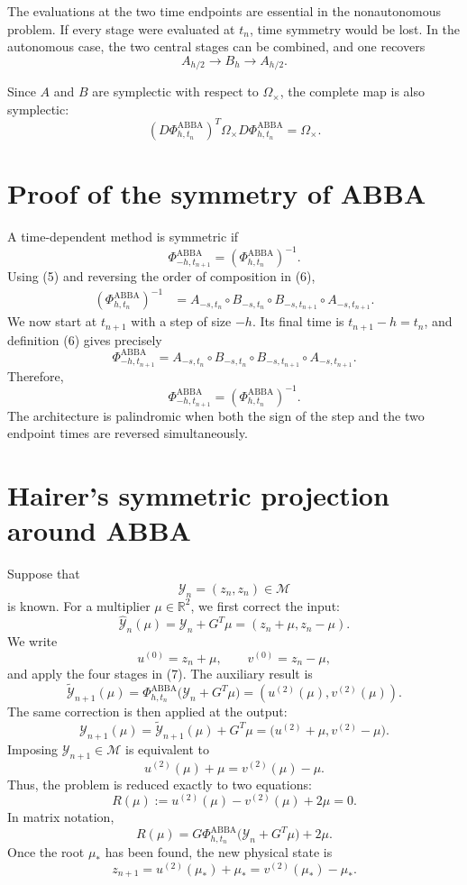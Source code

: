 \documentclass[11pt,a4paper]{article}
\newcommand{\R}{\mathbb{R}}
\newcommand{\Y}{\mathcal{Y}}
\newcommand{\M}{\mathcal{M}}
\newcommand{\Om}{\Omega_{\times}}
\newcommand{\PhiAB}{\Phi^{\mathrm{ABBA}}_{h,t_n}}
\begin{document}
The evaluations at the two time endpoints are essential in the nonautonomous problem.
If every stage were evaluated at $t_n$, time symmetry would be lost. In the autonomous
case, the two central stages can be combined, and one recovers
\[
 A_{h/2}\longrightarrow B_h\longrightarrow A_{h/2}.
\]

Since $A$ and $B$ are symplectic with respect to $\Om$, the complete map is also symplectic:
\[
 \boxed{
 (D\PhiAB)^T\Om D\PhiAB=\Om.
 } \tag{8}
\]

\section{Proof of the symmetry of ABBA}

A time-dependent method is symmetric if
\[
 \Phi^{\mathrm{ABBA}}_{-h,t_{n+1}}
 =\left(\Phi^{\mathrm{ABBA}}_{h,t_n}\right)^{-1}. \tag{9}
\]
Using (5) and reversing the order of composition in (6),
\begin{align*}
 \left(\Phi^{\mathrm{ABBA}}_{h,t_n}\right)^{-1}
 &={}
 A_{-s,t_n}
 \circ B_{-s,t_n}
 \circ B_{-s,t_{n+1}}
 \circ A_{-s,t_{n+1}}.
\end{align*}
We now start at $t_{n+1}$ with a step of size $-h$. Its final time is
$t_{n+1}-h=t_n$, and definition (6) gives precisely
\[
 \Phi^{\mathrm{ABBA}}_{-h,t_{n+1}}
 =A_{-s,t_n}
  \circ B_{-s,t_n}
  \circ B_{-s,t_{n+1}}
  \circ A_{-s,t_{n+1}}.
\]
Therefore,
\[
 \boxed{
 \Phi^{\mathrm{ABBA}}_{-h,t_{n+1}}
 =\left(\Phi^{\mathrm{ABBA}}_{h,t_n}\right)^{-1}.
 }
\]
The architecture is palindromic when both the sign of the step and the two endpoint times
are reversed simultaneously.

\section{Hairer's symmetric projection around ABBA}

Suppose that
\[
 \Y_n=(z_n,z_n)\in\M
\]
is known. For a multiplier $\mu\in\R^2$, we first correct the input:
\[
 \widehat{\Y}_n(\mu)
 =\Y_n+G^T\mu
 =(z_n+\mu,z_n-\mu).
\]
We write
\[
 u^{(0)}=z_n+\mu,
 \qquad
 v^{(0)}=z_n-\mu,
\]
and apply the four stages in (7). The auxiliary result is
\[
 \widetilde{\Y}_{n+1}(\mu)
 =\PhiAB\bigl(\Y_n+G^T\mu\bigr)
 =(u^{(2)}(\mu),v^{(2)}(\mu)).
\]
The same correction is then applied at the output:
\[
 \Y_{n+1}(\mu)
 =\widetilde{\Y}_{n+1}(\mu)+G^T\mu
 =\bigl(u^{(2)}+\mu,v^{(2)}-\mu\bigr). \tag{10}
\]
Imposing $\Y_{n+1}\in\M$ is equivalent to
\[
 u^{(2)}(\mu)+\mu=v^{(2)}(\mu)-\mu.
\]
Thus, the problem is reduced exactly to two equations:
\[
 \boxed{
 R(\mu)
 :=u^{(2)}(\mu)-v^{(2)}(\mu)+2\mu=0.
 } \tag{11}
\]
In matrix notation,
\[
 R(\mu)
 =G\PhiAB\bigl(\Y_n+G^T\mu\bigr)+2\mu. \tag{12}
\]
Once the root $\mu_*$ has been found, the new physical state is
\[
 \boxed{
 z_{n+1}=u^{(2)}(\mu_*)+\mu_*
          =v^{(2)}(\mu_*)-\mu_*.
 } \tag{13}
\]
\end{document}
